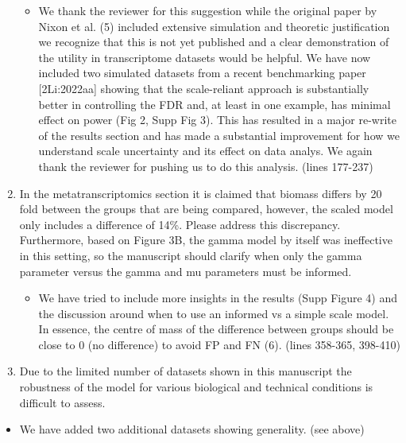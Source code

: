 \documentclass[
]{article}
\providecommand{\tightlist}{%
  \setlength{\itemsep}{0pt}\setlength{\parskip}{0pt}}
\begin{document}
\begin{enumerate}
  \begin{itemize}
  \tightlist
  \item
    We thank the reviewer for this suggestion while the original paper
    by Nixon et al. (5) included extensive simulation and theoretic
    justification we recognize that this is not yet published and a
    clear demonstration of the utility in transcriptome datasets would
    be helpful. We have now included two simulated datasets from a
    recent benchmarking paper {[}2Li:2022aa{]} showing that the
    scale-reliant approach is substantially better in controlling the
    FDR and, at least in one example, has minimal effect on power (Fig
    2, Supp Fig 3). This has resulted in a major re-write of the results
    section and has made a substantial improvement for how we understand
    scale uncertainty and its effect on data analys. We again thank the
    reviewer for pushing us to do this analysis. (lines 177-237)
  \end{itemize}
\item
  In the metatranscriptomics section it is claimed that biomass differs
  by 20 fold between the groups that are being compared, however, the
  scaled model only includes a difference of 14\%. Please address this
  discrepancy. Furthermore, based on Figure 3B, the gamma model by
  itself was ineffective in this setting, so the manuscript should
  clarify when only the gamma parameter versus the gamma and mu
  parameters must be informed.

  \begin{itemize}
  \tightlist
  \item
    We have tried to include more insights in the results (Supp Figure
    4) and the discussion around when to use an informed vs a simple
    scale model. In essence, the centre of mass of the difference
    between groups should be close to 0 (no difference) to avoid FP and
    FN (6). (lines 358-365, 398-410)
  \end{itemize}
\item
  Due to the limited number of datasets shown in this manuscript the
  robustness of the model for various biological and technical
  conditions is difficult to assess.
\end{enumerate}

\begin{itemize}
\tightlist
\item
  We have added two additional datasets showing generality. (see above)
\end{itemize}
\end{document}
